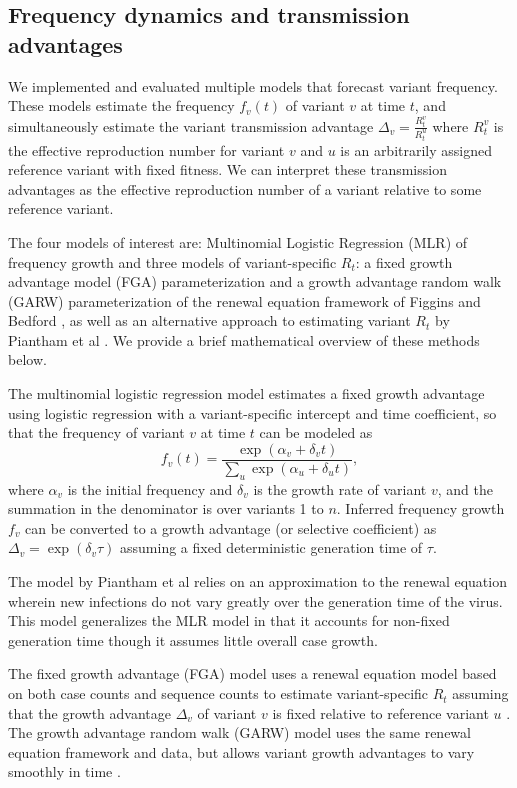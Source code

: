 \documentclass[11pt,oneside,letterpaper]{article}
\begin{document}
\subsection*{Frequency dynamics and transmission advantages}

We implemented and evaluated multiple models that forecast variant frequency.
These models estimate the frequency $f_{v}(t)$ of variant $v$ at time $t$, and simultaneously estimate the variant transmission advantage $\Delta_{v} = \frac{R_{t}^{v}}{R_{t}^{u}}$ where $R_{t}^{v}$ is the effective reproduction number for variant $v$ and $u$ is an arbitrarily assigned reference variant with fixed fitness.
We can interpret these transmission advantages as the effective reproduction number of a variant relative to some reference variant.

The four models of interest are: Multinomial Logistic Regression (MLR) of frequency growth and three models of variant-specific $R_t$: a fixed growth advantage model (FGA) parameterization and a growth advantage random walk (GARW) parameterization of the renewal equation framework of Figgins and Bedford \cite{figgins2022sars}, as well as an alternative approach to estimating variant $R_t$ by Piantham et al \cite{piantham2021estimating}.
We provide a brief mathematical overview of these methods below.

The multinomial logistic regression model estimates a fixed growth advantage using logistic regression with a variant-specific intercept and time coefficient, so that the frequency of variant $v$ at time $t$ can be modeled as
\begin{equation}
    f_{v}(t) = \frac{\exp(\alpha_{v} + \delta_{v} t)}{\sum_{u} \exp(\alpha_{u} + \delta_{u} t)},
\end{equation}
where $\alpha_v$ is the initial frequency and $\delta_v$ is the growth rate of variant $v$, and the summation in the denominator is over variants 1 to $n$.
Inferred frequency growth $f_v$ can be converted to a growth advantage (or selective coefficient) as $\Delta_{v} = \exp(\delta_{v} \tau)$ assuming a fixed deterministic  generation time of $\tau$.

The model by Piantham et al \cite{piantham2021estimating} relies on an approximation to the renewal equation wherein new infections do not vary greatly over the generation time of the virus.
This model generalizes the MLR model in that it accounts for non-fixed generation time though it assumes little overall case growth.

The fixed growth advantage (FGA) model uses a renewal equation model based on both case counts and sequence counts to estimate variant-specific $R_t$ assuming that the growth advantage $\Delta_{v}$ of variant $v$ is fixed relative to reference variant $u$ \cite{figgins2022sars}.
The growth advantage random walk (GARW) model uses the same renewal equation framework and data, but allows variant growth advantages to vary smoothly in time \cite{figgins2022sars}.
\end{document}
